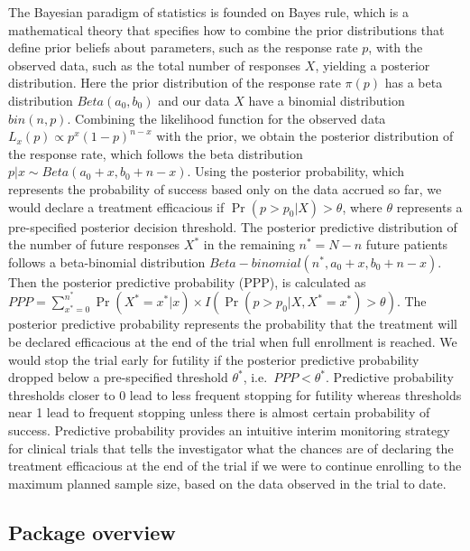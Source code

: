 The Bayesian paradigm of statistics is founded on Bayes rule, which is a
mathematical theory that specifies how to combine the prior
distributions that define prior beliefs about parameters, such as the
response rate \(p\), with the observed data, such as the total number of
responses \(X\), yielding a posterior distribution. Here the prior
distribution of the response rate \(\pi(p)\) has a beta distribution
\(Beta(a_0, b_0)\) and our data \(X\) have a binomial distribution
\(bin(n, p)\). Combining the likelihood function for the observed data
\(L_x(p) \propto p^x (1-p)^{n-x}\) with the prior, we obtain the
posterior distribution of the response rate, which follows the beta
distribution \(p|x \sim Beta(a_0 + x, b_0 + n - x)\). Using the
posterior probability, which represents the probability of success based
only on the data accrued so far, we would declare a treatment
efficacious if \(\Pr(p>p_0 | X) > \theta\), where \(\theta\) represents
a pre-specified posterior decision threshold. The posterior predictive
distribution of the number of future responses \(X^*\) in the remaining
\(n^*=N-n\) future patients follows a beta-binomial distribution
\(Beta-binomial(n^*, a_0 + x, b_0 + n - x)\). Then the posterior
predictive probability (PPP), is calculated as
\(PPP = \sum_{{x^*}=0}^{n^*} \Pr(X^*=x^*|x) \times I(\Pr(p>p_0 | X, X^*=x^*) > \theta)\).
The posterior predictive probability represents the probability that the
treatment will be declared efficacious at the end of the trial when full
enrollment is reached. We would stop the trial early for futility if the
posterior predictive probability dropped below a pre-specified threshold
\(\theta^*\), i.e.~\(PPP<\theta^*\). Predictive probability thresholds
closer to 0 lead to less frequent stopping for futility whereas
thresholds near 1 lead to frequent stopping unless there is almost
certain probability of success. Predictive probability provides an
intuitive interim monitoring strategy for clinical trials that tells the
investigator what the chances are of declaring the treatment efficacious
at the end of the trial if we were to continue enrolling to the maximum
planned sample size, based on the data observed in the trial to date.

\hypertarget{package-overview}{%
\subsection{Package overview}\label{package-overview}}

